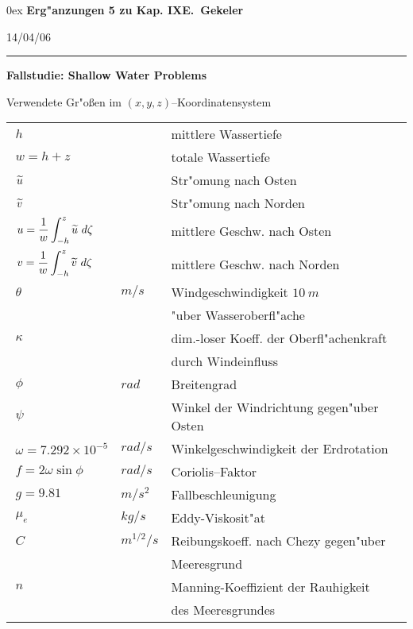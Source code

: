 \documentclass[12pt,a4paper,leqno,twoside]{book}
\begin{document}
\newcommand{\Release}{14/04/06}
\addtolength{\abovedisplayshortskip}{-1ex}
\setlength{\fboxsep}{1.5ex}
\parindent0ex
%
{\large\bf Erg"anzungen 5 zu Kap. IX\hfill E.\ Gekeler
}
\par
\vspace{-1mm}
\hfill{\footnotesize\Release\ }
\par
\vspace{-2mm}
\rule{\textwidth}{1pt}
\par\vspace{2ex}
{\bf Fallstudie: Shallow Water Problems}
\par
%
Verwendete Gr"o\ss en im $(x,y,z)$--Koor\-dinaten\-system
%
\bc
\begin{tabular}{|lll|}\hline
$\ h$               && mittlere Wassertiefe\\
$\ w = h + z$  && totale Wassertiefe\\
$\ \wi{u}$               && Str"omung nach Osten\\
$\ \wi{v}$               && Str"omung nach Norden\\
$\ \displaystyle u = \frac{1}{w}\int_{-h}^z \widetilde{u}\ d\zeta $ && mittlere Geschw. nach
Osten\\
$\ \displaystyle v = \frac{1}{w}\int_{-h}^z \widetilde{v}\ d\zeta$ && mittlere Geschw. nach
Norden\\
$\ \theta$ & $m/s$ & Windgeschwindigkeit $10 \ m$ \\
&&"uber Wasseroberfl"ache\\
$\ \kappa$ && dim.-loser Koeff. der Oberfl"achenkraft\\
&& durch Windeinfluss\\
$\ \phi $ & $rad$ & Breitengrad\\
$\ \psi$  && Winkel der Windrichtung gegen"uber Osten\\
$\ \omega = 7.292\times 10^{-5}$ & $rad/s$
&  Winkelgeschwindigkeit der Erdrotation\\
$\ f = 2\omega  \sin \phi $ & $rad/s$ & {\sc Coriolis}--Faktor\\
$\ g = 9.81$ & $m/s^2$ & Fallbeschleunigung \\
$\ \mu _e$ & $kg/s$ & {\sc Eddy}-Viskosit"at\\
$\ C$ &$m^{1/2}/s$ & Reibungskoeff. nach {\sc Chezy} gegen"uber\\
&& Meeresgrund \\
$\ n$ && {\sc Manning}-Koeffizient der Rauhigkeit\\
&& des Meeresgrundes\\ \hline
\end{tabular}
\ec
					
\end{document}

